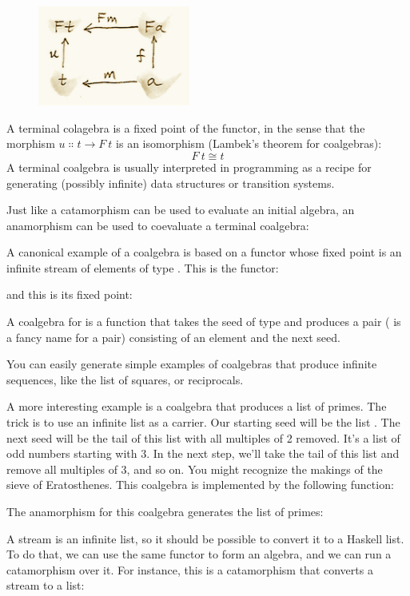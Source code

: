 \begin{figure}[H]
\centering
\includegraphics[width=50mm]{images/alg7.png}
\end{figure}

\noindent
A terminal colagebra is a fixed point of the functor, in the sense that
the morphism $u \Colon t \to F\ t$ is an isomorphism
(Lambek's theorem for coalgebras):
\[F\ t \cong t\]
A terminal coalgebra is usually interpreted in programming as a recipe
for generating (possibly infinite) data structures or transition
systems.

Just like a catamorphism can be used to evaluate an initial algebra, an
anamorphism can be used to coevaluate a terminal coalgebra:

A canonical example of a coalgebra is based on a functor whose fixed
point is an infinite stream of elements of type . This is the
functor:

and this is its fixed point:

A coalgebra for  is a function that takes the seed of
type  and produces a pair ( is a fancy name
for a pair) consisting of an element and the next seed.

You can easily generate simple examples of coalgebras that produce
infinite sequences, like the list of squares, or reciprocals.

A more interesting example is a coalgebra that produces a list of
primes. The trick is to use an infinite list as a carrier. Our starting
seed will be the list \code{{[}2..{]}}. The next seed will be the tail
of this list with all multiples of 2 removed. It's a list of odd numbers
starting with 3. In the next step, we'll take the tail of this list and
remove all multiples of 3, and so on. You might recognize the makings of
the sieve of Eratosthenes. This coalgebra is implemented by the
following function:

The anamorphism for this coalgebra generates the list of primes:

A stream is an infinite list, so it should be possible to convert it to
a Haskell list. To do that, we can use the same functor 
to form an algebra, and we can run a catamorphism over it. For instance,
this is a catamorphism that converts a stream to a list:

